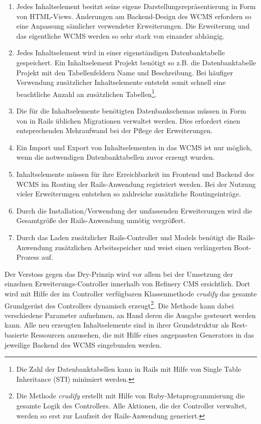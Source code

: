\begin{enumerate}
\item
Jedes Inhaltselement besitzt seine eigene Darstellungsrepräsentierung in Form von HTML-Views. Änderungen am Backend-Design des WCMS erfordern so eine Anpassung sämlicher verwendeter Erweiterungen. Die Erweiterung und das eigentliche WCMS werden so sehr stark von einander abhängig.
\item
Jedes Inhaltselement wird in einer eigenständigen Datenbanktabelle gespeichert. Ein Inhaltselement Projekt
benötigt so z.B. die Datenbanktabelle Projekt mit den Tabellenfeldern Name und Beschreibung. Bei häufiger Verwendung zusätzlicher Inhaltselemente entsteht somit schnell eine beachtliche Anzahl an zusätzlichen Tabellen\footnote{Die Zahl der Datenbanktabellen kann in Rails mit Hilfe von Single Table Inheritance (STI) minimiert werden.}.
\item
Die für die Inhaltselemente benötigten Datenbankschemas müssen in Form von in Rails üblichen Migrationen verwaltet werden. Dies erfordert einen entsprechenden Mehraufwand bei der Pflege der Erweiterungen.
\item
Ein Import und Export von Inhaltselementen in das WCMS ist nur möglich, wenn die notwendigen Datenbanktabellen zuvor erzeugt wurden.
\item
Inhaltselemente müssen für ihre Erreichbarkeit im Frontend und Backend des WCMS im Routing der Rails-Anwendung registriert werden. Bei der Nutzung vieler Erweiterungen entstehen so zahlreiche zusätzliche Routingeinträge.
\item
Durch die Installation/Verwendung der umfassenden Erweiterungen wird die Gesamtgröße der Rails-Anwendung unnötig vergrößert.
\item
Durch das Laden zusätzlicher Rails-Controller und Models benötigt die Rails-Anwendung zusätzlichen Arbeitsspeicher und weist einen verlängerten Boot-Prozess auf.
\end{enumerate}


Der Verstoss gegen das Dry-Prinzip wird vor allem bei der Umsetzung der einzelnen Erweiterungs-Controller innerhalb von Refinery CMS ersichtlich. Dort wird mit Hilfe der im Controller verfügbaren Klassenmethode \emph{crudify} das gesamte Grundgerüst des Controllers dynamisch erzeugt\footnote{Die Methode \emph{crudify} erstellt mit Hilfe von Ruby-Metaprogrammierung die gesamte Logik des Controllers. Alle Aktionen, die der Controller verwaltet, werden so erst zur Laufzeit der Rails-Anwendung generiert.}. Die Methode kann dabei verschiedene Parameter aufnehmen, an Hand deren die Ausgabe gesteuert werden kann. Alle neu erzeugten Inhaltselemente sind in ihrer Grundstruktur als Rest-basierte Ressourcen anzusehen, die mit Hilfe eines angepassten Generators in das jeweilige Backend des WCMS eingebunden werden.

